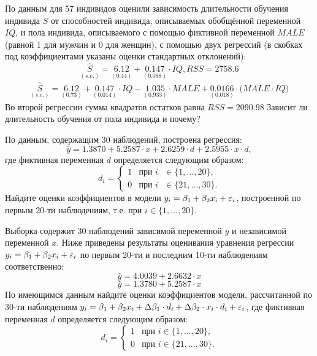 \documentclass[pdftex,11pt,openany]{book}\usepackage[]{graphicx}\usepackage[]{color}
\begin{document}
\begin{problem}
 По данным для 57 индивидов оценили зависимость длительности обучения индивида $S$ от способностей индивида, описываемых обобщённой переменной $IQ$, и пола индивида, описываемого с помощью фиктивной переменной $MALE$ (равной 1 для мужчин и 0 для женщин), с помощью двух регрессий (в скобках под коэффициентами указаны оценки стандартных отклонений):
\[
\underset{(s.e.)}{\hat{S}}=\underset{(0.44)}{6.12}+\underset{(0.088)}{0.147}\cdot{IQ}, RSS=2758.6
\]
\begin{multline}
\underset{(s.e.)}{\hat{S}}=\underset{(0.73)}{6.12}+\underset{(0.014)}{0.147}\cdot{IQ}-\underset{(0.933)}{1.035}\cdot{MALE}+\underset{(0.018)}{0.0166}\cdot{(MALE}\cdot{IQ)}
\end{multline}
Во второй регрессии сумма квадратов остатков равна $RSS=2090.98$
Зависит ли длительность обучения от пола индивида и почему?
\end{problem}

\begin{solution}
\end{solution}


\begin{problem}
 По данным, содержащим 30 наблюдений, построена регрессия:
\[
\hat{y}=1.3870+5.2587\cdot{x}+2.6259\cdot{d}+2.5955 \cdot{x} \cdot{d},
\]
где фиктивная переменная $d$ определяется следующим образом:
\[
d_i =
  \begin{cases}
    1 & \text{при $i$ $\in \bigl\{ 1,\dots,20 \bigr\} $}, \\
    0 & \text{при $i$ $\in \bigl\{ 21,\dots,30 \bigr\} $}. 
 \end{cases}
\]
Найдите оценки коэффициентов в модели $y_i=\beta_1+\beta_2 x_i+\varepsilon_i$, построенной по первым 20-ти наблюдениям, т.е. при $i \in \bigl\{1,\dots,20 \bigr\}$.
\end{problem}

\begin{solution}
\end{solution}


\begin{problem}
 Выборка содержит 30 наблюдений зависимой переменной $y$ и независимой переменной $x$. Ниже приведены результаты оценивания уравнения регрессии $y_i=\beta_1+\beta_2 x_i+\varepsilon_i$ по первым 20-ти и последним 10-ти наблюдениям соответственно:
\[
\hat{y}=4.0039+2.6632\cdot{x}
\]
\[
\hat{y}=1.3780+5.2587\cdot{x}
\]
По имеющимся данным найдите оценки коэффициентов  модели, рассчитанной по 30-ти наблюдениям $y_i=\beta_1+\beta_2 x_i+\Delta{\beta_1} \cdot{d_i} + \Delta{\beta_2} \cdot{x_i} \cdot{d_i}+\varepsilon_i$, где фиктивная переменная $d$ определяется следующим образом:
\[
d_i =
  \begin{cases}
    1 & \text{при } i \in \bigl\{ 1,\dots,20 \bigr\} , \\
    0 & \text{при } i \in \bigl\{ 21,\dots,30 \bigr\} . 
 \end{cases}
\]
\end{problem}
\end{document}
